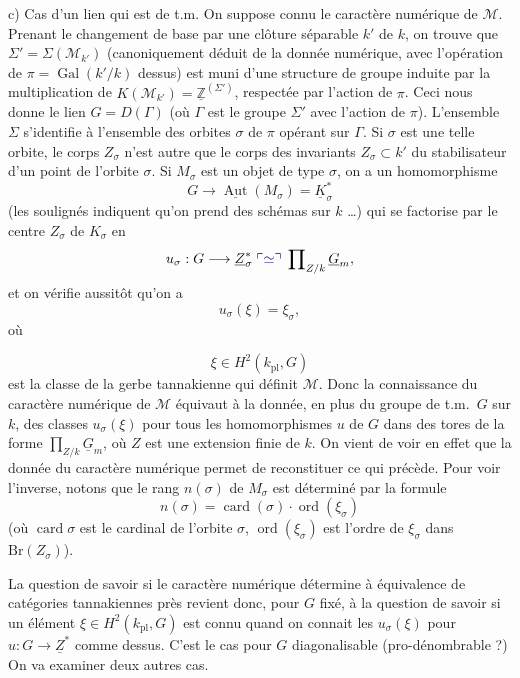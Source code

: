 \documentclass[11pt,a4paper]{article}
\begin{document}
c) \quad Cas d'un lien qui est de t.m. On suppose connu le caractère
numérique \struck{\ill{}} de $\mathcal{M}$. Prenant le changement de base par
une clôture séparable $k'$ de $k$, on trouve que
$\Sigma' = \Sigma(\mathcal{M}_{k'})$ (canoniquement déduit de la donnée
numérique, avec l'opération de $\pi = \operatorname{Gal}(k'/k)$ dessus) est
muni d'une structure de groupe induite par la multiplication de
$K(\mathcal{M}_{k'}) = \underline{\mathbb{Z}}^{(\Sigma')}$,
\struck{\ill{}} respectée par l'action de $\pi$. Ceci nous donne le lien
$G = D(\Gamma)$ (où $\Gamma$ est le groupe $\Sigma'$ avec l'action de $\pi$).
L'ensemble $\Sigma$ s'identifie à l'ensemble des orbites $\sigma$ de $\pi$
opérant sur $\Gamma$. Si $\sigma$ est une telle orbite, le corps
$Z_{\sigma}$ n'est autre que le corps des invariants
$Z_{\sigma} \subset k'$ du stabilisateur d'un point de l'orbite $\sigma$. Si
$M_{\sigma}$ est un objet de type $\sigma$, on a un homomorphisme
\[
G \longrightarrow \underline{\operatorname{Aut}}(M_{\sigma}) = \underline{K}^{*}_{\sigma}
\]
(les soulignés indiquent qu'on prend des schémas sur $k$ …) qui se
factorise par le centre $Z_{\sigma}$ de $K_{\sigma}$ en
\[
u_{\sigma} : G \longrightarrow \underline{Z}^{*}_{\sigma}
\;\add{\simeq}\; \prod\nolimits_{Z/k} \underline{G}_{m} ,
\]
et on vérifie aussitôt qu'on a
\[
u_{\sigma}(\xi) = \xi_{\sigma} ,
\]
où

\[
\xi \in H^{2}(k_{\mathrm{pl}}, G)
\]
est la classe de la gerbe tannakienne qui définit $\mathcal{M}$. Donc la
connaissance du caractère numérique de $\mathcal{M}$ équivaut à la donnée, en
plus du \struck{\ill{}} groupe de t.m.\ $G$ sur $k$, des classes
$u_{\sigma}(\xi)$ pour tous les homomorphismes $u$ de $G$ dans des tores de
la forme $\prod_{Z/k} \underline{G}_{m}$, où $Z$ est une extension finie de
$k$. \struck{(}On vient de voir en effet que la donnée du caractère numérique
permet de reconstituer ce qui précède. Pour voir l'inverse, notons que
 le rang $n(\sigma)$ de $M_{\sigma}$ est déterminé par la formule
\[
n(\sigma) = \operatorname{card}(\sigma)\cdot\operatorname{ord}(\xi_{\sigma})
\]
(où $\operatorname{card}\sigma$ est le cardinal de l'orbite $\sigma$,
$\operatorname{ord}(\xi_{\sigma})$ est l'ordre de $\xi_{\sigma}$ dans
$\mathrm{Br}(Z_{\sigma})$).

La question de savoir si le caractère numérique détermine à équivalence de
catégories tannakiennes près revient donc, pour $G$ fixé, à la question de
savoir si un élément \struck{\ill{}} $\xi \in H^{2}(k_{\mathrm{pl}}, G)$ est
connu quand on connait les $u_{\sigma}(\xi)$ pour $u : G \to \underline{Z}^{*}$
comme dessus. \struck{\ill{}} C'est le cas pour $G$ diagonalisable
 (pro-dénombrable ?) On va examiner deux autres cas.
\end{document}
